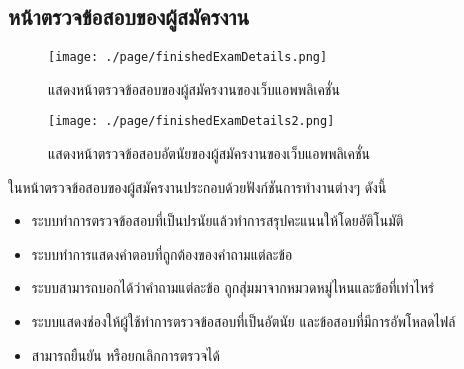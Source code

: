 \subsection{หน้าตรวจข้อสอบของผู้สมัครงาน}
\begin{figure}[H]
  \centering
  \texttt{[image: ./page/finishedExamDetails.png]}
  \caption{แสดงหน้าตรวจข้อสอบของผู้สมัครงานของเว็บแอพพลิเคชั่น}
  \label{Fig:finishedExamDetails}
\end{figure}
\begin{figure}[H]
    \centering
    \texttt{[image: ./page/finishedExamDetails2.png]}
    \caption{แสดงหน้าตรวจข้อสอบอัตนัยของผู้สมัครงานของเว็บแอพพลิเคชั่น}
    \label{Fig:FinishedExamDetailATN}
  \end{figure}
ในหน้าตรวจข้อสอบของผู้สมัครงานประกอบด้วยฟังก์ชันการทำงานต่างๆ ดังนี้
\begin{itemize}
    \item ระบบทำการตรวจข้อสอบที่เป็นปรนัยแล้วทำการสรุปคะแนนให้โดยอัติโนมัติ
    \item ระบบทำการแสดงคำตอบที่ถูกต้องของคำถามแต่ละข้อ
    \item ระบบสามารถบอกได้ว่าคำถามแต่ละข้อ ถูกสุ่มมาจากหมวดหมู่ไหนและข้อที่เท่าไหร่
    \item ระบบแสดงช่องให้ผู้ใช้ทำการตรวจข้อสอบที่เป็นอัตนัย และข้อสอบที่มีการอัพโหลดไฟล์
    \item สามารถยืนยัน หรือยกเลิกการตรวจได้
\end{itemize}